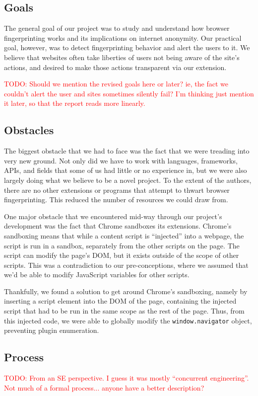 \documentclass[12pt,a4paper]{article}
\begin{document}
\subsection{Goals}
The general goal of our project was to study and understand how browser fingerprinting works and its implications on internet anonymity. Our practical goal, however, was to detect fingerprinting behavior and alert the users to it. We believe that websites often take liberties of users not being aware of the site's actions, and desired to make those actions transparent via our extension.

\textcolor{red}{TODO: Should we mention the revised goals here or later? ie, the fact we couldn't alert the user and sites sometimes silently fail? I'm thinking just mention it later, so that the report reads more linearly.}

\subsection{Obstacles}
The biggest obstacle that we had to face was the fact that we were treading into very new ground. Not only did we have to work with languages, frameworks, APIs, and fields that some of us had little or no experience in, but we were also largely doing what we believe to be a novel project. To the extent of the authors, there are no other extensions or programs that attempt to thwart browser fingerprinting. This reduced the number of resources we could draw from.

One major obstacle that we encountered mid-way through our project's development was the fact that Chrome sandboxes its extensions. Chrome's sandboxing means that while a content script is ``injected'' into a webpage, the script is run in a sandbox, separately from the other scripts on the page. The script can modify the page's DOM, but it exists outside of the scope of other scripts. This was a contradiction to our pre-conceptions, where we assumed that we'd be able to modify JavaScript variables for other scripts.

Thankfully, we found a solution to get around Chrome's sandboxing, namely by inserting a script element into the DOM of the page, containing the injected script that had to be run in the same scope as the rest of the page. Thus, from this injected code, we were able to globally modify the \texttt{window.navigator} object, preventing plugin enumeration.

\subsection{Process}
\textcolor{red}{TODO: From an SE perspective. I guess it was mostly ``concurrent engineering''. Not much of a formal process... anyone have a better description?}
\end{document}
